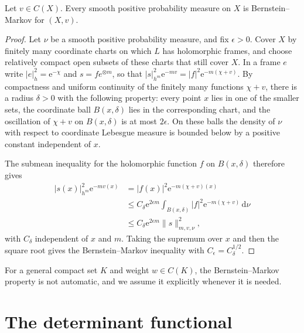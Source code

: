 \begin{proposition}\label{prop:hermitian-full-bm}
Let $v\in C(X)$. Every smooth positive probability measure on $X$ is Bernstein--Markov for $(X,v)$.
\end{proposition}
\begin{proof}
Let $\nu$ be a smooth positive probability measure, and fix $\epsilon>0$. Cover $X$ by finitely many coordinate charts on which $L$ has holomorphic frames, and choose relatively compact open subsets of these charts that still cover $X$. In a frame $e$ write $|e|_h^2=\mathrm{e}^{-\chi}$ and $s=f e^{\otimes m}$, so that $|s|_{h^m}^2\mathrm{e}^{-mv}=|f|^2\mathrm{e}^{-m(\chi+v)}$. By compactness and uniform continuity of the finitely many functions $\chi+v$, there is a radius $\delta>0$ with the following property: every point $x$ lies in one of the smaller sets, the coordinate ball $B(x,\delta)$ lies in the corresponding chart, and the oscillation of $\chi+v$ on $B(x,\delta)$ is at most $2\epsilon$. On these balls the density of $\nu$ with respect to coordinate Lebesgue measure is bounded below by a positive constant independent of $x$.

The submean inequality for the holomorphic function $f$ on $B(x,\delta)$ therefore gives
\[
 \begin{split}
 |s(x)|_{h^m}^2\mathrm{e}^{-mv(x)}
 &=|f(x)|^2\mathrm{e}^{-m(\chi+v)(x)}\\
 &\leq C_\delta \mathrm{e}^{2\epsilon m}
                 \int_{B(x,\delta)}|f|^2\mathrm{e}^{-m(\chi+v)}\,\mathrm{d}\nu\\
 &\leq C_\delta \mathrm{e}^{2\epsilon m}\|s\|_{m,v,\nu}^2,
 \end{split}
\]
with $C_\delta$ independent of $x$ and $m$. Taking the supremum over $x$ and then the square root gives the Bernstein--Markov inequality with $C_\epsilon=C_\delta^{1/2}$.
\end{proof}

For a general compact set $K$ and weight $w\in C(K)$, the Bernstein--Markov property is not automatic, and we assume it explicitly whenever it is needed.





\section{The determinant functional}
\label{sec:partial-determinant}

